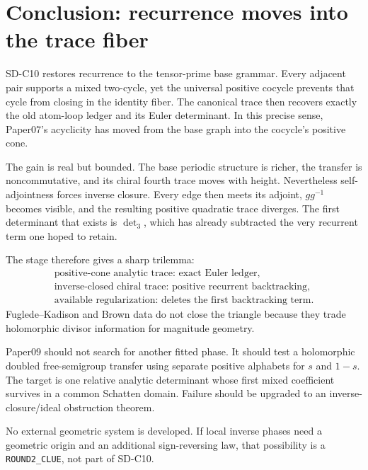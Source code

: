 \section{Conclusion: recurrence moves into the trace fiber}
\label{sec:conclusion}

SD-C10 restores recurrence to the tensor-prime base grammar.  Every adjacent
pair supports a mixed two-cycle, yet the universal positive cocycle prevents
that cycle from closing in the identity fiber.  The canonical trace then
recovers exactly the old atom-loop ledger and its Euler determinant.  In this
precise sense, Paper07's acyclicity has moved from the base graph into the
cocycle's positive cone.

The gain is real but bounded.  The base periodic structure is richer, the
transfer is noncommutative, and its chiral fourth trace moves with height.
Nevertheless self-adjointness forces inverse closure.  Every edge then meets
its adjoint, $gg^{-1}$ becomes visible, and the resulting positive quadratic
trace diverges.  The first determinant that exists is $\det_3$, which has
already subtracted the very recurrent term one hoped to retain.

The stage therefore gives a sharp trilemma:
\[
 \boxed{
 \begin{gathered}
 \text{positive-cone analytic trace: exact Euler ledger},\\
 \text{inverse-closed chiral trace: positive recurrent backtracking},\\
 \text{available regularization: deletes the first backtracking term}.
 \end{gathered}}
\]
Fuglede--Kadison and Brown data do not close the triangle because they trade
holomorphic divisor information for magnitude geometry.

Paper09 should not search for another fitted phase.  It should test a
holomorphic doubled free-semigroup transfer using separate positive
alphabets for $s$ and $1-s$.  The target is one relative analytic determinant
whose first mixed coefficient survives in a common Schatten domain.  Failure
should be upgraded to an inverse-closure/ideal obstruction theorem.

No external geometric system is developed.  If local inverse phases need a
geometric origin and an additional sign-reversing law, that possibility is a
\texttt{ROUND2\_CLUE}, not part of SD-C10.
